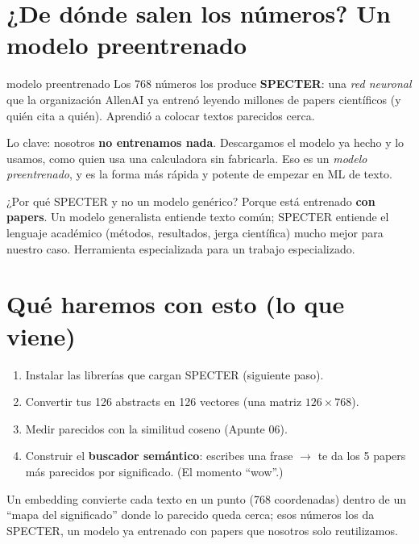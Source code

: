 \documentclass[11pt,a4paper]{article}
\begin{document}
\section{¿De dónde salen los números? Un modelo preentrenado}

\begin{concepto}{modelo preentrenado}
Los 768 números los produce \textbf{SPECTER}: una \emph{red neuronal} que la organización
AllenAI ya entrenó leyendo millones de papers científicos (y quién cita a quién). Aprendió
a colocar textos parecidos cerca.

Lo clave: nosotros \textbf{no entrenamos nada}. Descargamos el modelo ya hecho y lo usamos,
como quien usa una calculadora sin fabricarla. Eso es un \emph{modelo preentrenado}, y es
la forma más rápida y potente de empezar en ML de texto.
\end{concepto}

\begin{ojo}
¿Por qué SPECTER y no un modelo genérico? Porque está entrenado \textbf{con papers}.
Un modelo generalista entiende texto común; SPECTER entiende el lenguaje académico (métodos,
resultados, jerga científica) mucho mejor para nuestro caso. Herramienta especializada para
un trabajo especializado.
\end{ojo}

\section{Qué haremos con esto (lo que viene)}

\begin{enumerate}
  \item Instalar las librerías que cargan SPECTER (siguiente paso).
  \item Convertir tus 126 abstracts en 126 vectores (una matriz $126 \times 768$).
  \item Medir parecidos con la similitud coseno (Apunte 06).
  \item Construir el \textbf{buscador semántico}: escribes una frase $\rightarrow$ te da los
        5 papers más parecidos por significado. (El momento ``wow''.)
\end{enumerate}

\begin{resumen}
Un embedding convierte cada texto en un punto (768 coordenadas) dentro de un ``mapa del
significado'' donde lo parecido queda cerca; esos números los da SPECTER, un modelo ya
entrenado con papers que nosotros solo reutilizamos.
\end{resumen}
\clearpage
{}
{}
\end{document}
